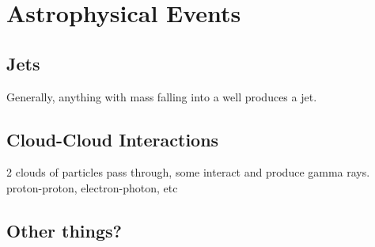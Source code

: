 \section{Astrophysical Events}

\subsection{Jets}
Generally, anything with mass falling into a well produces a jet.

\subsection{Cloud-Cloud Interactions}
2 clouds of particles pass through, some interact and produce gamma rays.
proton-proton, electron-photon, etc

\subsection{Other things?}

